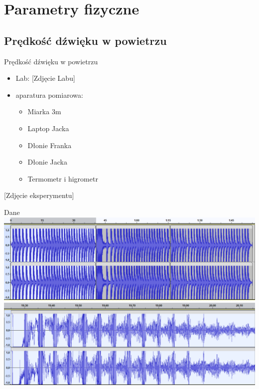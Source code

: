\documentclass{beamer}
\begin{document}
\section{Parametry fizyczne}

\subsection{Prędkość dźwięku w powietrzu}

\begin{frame}{Prędkość dźwięku w powietrzu}
\begin{itemize}
\item Lab: [Zdjęcie Labu]
\item aparatura pomiarowa:
	\begin{itemize}
		\item Miarka $3$m
		\item Laptop Jacka
		\item Dłonie Franka
		\item Dłonie Jacka
		\item Termometr i higrometr
	\end{itemize}
\end{itemize}
[Zdjęcie eksperymentu]
\end{frame}

\begin{frame}{Dane}
\includegraphics[width=\linewidth]{Data.png}
\includegraphics[width=\linewidth]{Data_zoom.png}
\end{frame}
\end{document}
